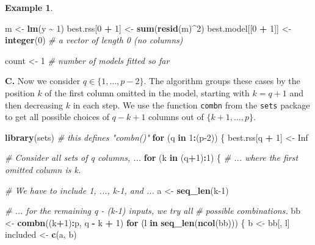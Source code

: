 \documentclass[
  a4paper,
]{article}
\newenvironment{Shaded}{\begin{snugshade}}{\end{snugshade}}
\newcommand{\CommentTok}[1]{\textcolor[rgb]{0.56,0.35,0.01}{\textit{#1}}}
\newcommand{\ConstantTok}[1]{\textcolor[rgb]{0.56,0.35,0.01}{#1}}
\newcommand{\ControlFlowTok}[1]{\textcolor[rgb]{0.13,0.29,0.53}{\textbf{#1}}}
\newcommand{\DecValTok}[1]{\textcolor[rgb]{0.00,0.00,0.81}{#1}}
\newcommand{\FunctionTok}[1]{\textcolor[rgb]{0.13,0.29,0.53}{\textbf{#1}}}
\newcommand{\NormalTok}[1]{#1}
\newcommand{\OtherTok}[1]{\textcolor[rgb]{0.56,0.35,0.01}{#1}}
\newcommand{\SpecialCharTok}[1]{\textcolor[rgb]{0.81,0.36,0.00}{\textbf{#1}}}
\theoremstyle{definition}
\theoremstyle{definition}
\newtheorem{example}{Example}[section]
\theoremstyle{definition}
\theoremstyle{definition}
\theoremstyle{remark}
\begin{document}
\begin{example}
\begin{Shaded}
\begin{Highlighting}[]
\NormalTok{m }\OtherTok{\textless{}{-}} \FunctionTok{lm}\NormalTok{(y }\SpecialCharTok{\textasciitilde{}} \DecValTok{1}\NormalTok{)}
\NormalTok{best.rss[}\DecValTok{0} \SpecialCharTok{+} \DecValTok{1}\NormalTok{] }\OtherTok{\textless{}{-}} \FunctionTok{sum}\NormalTok{(}\FunctionTok{resid}\NormalTok{(m)}\SpecialCharTok{\^{}}\DecValTok{2}\NormalTok{)}
\NormalTok{best.model[[}\DecValTok{0} \SpecialCharTok{+} \DecValTok{1}\NormalTok{]] }\OtherTok{\textless{}{-}} \FunctionTok{integer}\NormalTok{(}\DecValTok{0}\NormalTok{) }\CommentTok{\# a vector of length 0 (no columns)}

\NormalTok{count }\OtherTok{\textless{}{-}} \DecValTok{1} \CommentTok{\# number of models fitted so far}
\end{Highlighting}
\end{Shaded}

\textbf{C.} Now we consider \(q \in \{1, \ldots, p-2\}\). The algorithm groups
these cases by the position \(k\) of the first column omitted in the model,
starting with \(k = q+1\) and then decreasing \(k\) in each step.
We use the function \texttt{combn} from the \texttt{sets} package
to get all possible choices of
\(q - k + 1\) columns out of \(\{k+1, \ldots, p\}\).

\begin{Shaded}
\begin{Highlighting}[]
\FunctionTok{library}\NormalTok{(sets) }\CommentTok{\# this defines "combn()"}
\ControlFlowTok{for}\NormalTok{ (q }\ControlFlowTok{in} \DecValTok{1}\SpecialCharTok{:}\NormalTok{(p}\DecValTok{{-}2}\NormalTok{)) \{}
\NormalTok{    best.rss[q }\SpecialCharTok{+} \DecValTok{1}\NormalTok{] }\OtherTok{\textless{}{-}} \ConstantTok{Inf}

    \CommentTok{\# Consider all sets of q columns, ...}
    \ControlFlowTok{for}\NormalTok{ (k }\ControlFlowTok{in}\NormalTok{ (q}\SpecialCharTok{+}\DecValTok{1}\NormalTok{)}\SpecialCharTok{:}\DecValTok{1}\NormalTok{) \{}
        \CommentTok{\# ... where the first omitted column is k.}

        \CommentTok{\# We have to include 1, ..., k{-}1, and ...}
\NormalTok{        a }\OtherTok{\textless{}{-}} \FunctionTok{seq\_len}\NormalTok{(k}\DecValTok{{-}1}\NormalTok{)}

        \CommentTok{\# ... for the remaining q {-} (k{-}1) inputs, we try all}
        \CommentTok{\# possible combinations.}
\NormalTok{        bb }\OtherTok{\textless{}{-}} \FunctionTok{combn}\NormalTok{((k}\SpecialCharTok{+}\DecValTok{1}\NormalTok{)}\SpecialCharTok{:}\NormalTok{p, q }\SpecialCharTok{{-}}\NormalTok{ k }\SpecialCharTok{+} \DecValTok{1}\NormalTok{)}
        \ControlFlowTok{for}\NormalTok{ (l }\ControlFlowTok{in} \FunctionTok{seq\_len}\NormalTok{(}\FunctionTok{ncol}\NormalTok{(bb))) \{}
\NormalTok{            b }\OtherTok{\textless{}{-}}\NormalTok{ bb[, l]}
\NormalTok{            included }\OtherTok{\textless{}{-}} \FunctionTok{c}\NormalTok{(a, b)}


\end{Highlighting}
\end{Shaded}
\end{example}
\end{document}
